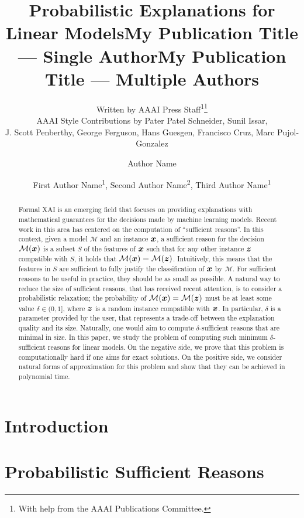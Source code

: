 \documentclass[letterpaper]{article} %
\title{Probabilistic Explanations for Linear Models}
\author{
    Written by AAAI Press Staff\textsuperscript{\rm 1}\thanks{With help from the AAAI Publications Committee.}\\
    AAAI Style Contributions by Pater Patel Schneider,
    Sunil Issar,\\
    J. Scott Penberthy,
    George Ferguson,
    Hans Guesgen,
    Francisco Cruz\equalcontrib,
    Marc Pujol-Gonzalez\equalcontrib
}
\title{My Publication Title --- Single Author}
\author {
    Author Name
}
\title{My Publication Title --- Multiple Authors}
\author {
    First Author Name\textsuperscript{\rm 1},
    Second Author Name\textsuperscript{\rm 2},
    Third Author Name\textsuperscript{\rm 1}
}
\newcommand{\M}{\mathcal{M}}
\begin{document}
\maketitle

\begin{abstract}
Formal XAI is an emerging field that focuses on providing explanations
with mathematical guarantees for the decisions made by machine
learning models. Recent work in this area has centered on the
computation of ``sufficient reasons''. In this context, given a model $\M$
and an instance ${\bm{x}}$, a sufficient reason for the decision $\M(\vx)$ is a
subset $S$ of the features of ${\bm{x}}$ such that for any other instance ${\bm{z}}$
compatible with $S$, it holds that $\M(\vx) = \M(\vz)$. Intuitively, this means
that the features in $S$ are sufficient to fully justify the
classification of ${\bm{x}}$ by $\M$.
For sufficient reasons to be useful in practice, they should be as
small as possible. A natural way to reduce the size of sufficient
reasons, that has received recent attention, is to consider a
probabilistic relaxation; the probability of $\M(\vx) = \M(\vz)$ must
be at least some value $\delta \in (0,1]$, where ${\bm{z}}$ is a random
  instance compatible with ${\bm{x}}$. In particular, $\delta$ is a
  parameter provided by the user, that represents a trade-off between
  the explanation quality and its size. Naturally, one would aim to
  compute $\delta$-sufficient reasons that are minimal in size. In this
  paper, we study the problem of computing such minimum
  $\delta$-sufficient reasons for linear models. On the negative side, we
  prove that this problem is computationally hard if one aims for
  exact solutions. On the positive side, we consider natural forms of
  approximation for this problem and show that they can be achieved in
  polynomial time.
\end{abstract}


\section{Introduction}
\label{sec-into}


\section{Probabilistic Sufficient Reasons}
\label{sec-prop-SR}


\end{document}
